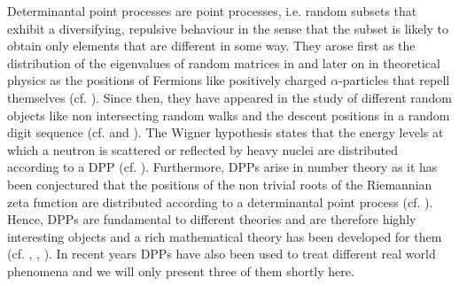 Determinantal point processes are point processes, i.e. random subsets that exhibit a diversifying, repulsive behaviour in the sense that the subset is likely to obtain only elements that are different in some way. They arose first as the distribution of the eigenvalues of random matrices in \cite{mehta1960density} and later on in theoretical physics as the positions of Fermions like positively charged \(\alpha\)-particles that repell themselves (cf. \cite{benard1973detection}). Since then, they have appeared in the study of different random objects like non intersecting random walks and the descent positions in a random digit sequence (cf. \cite{johansson2004determinantal} and \cite{borodin2010adding}). The Wigner hypothesis states that the energy levels at which a neutron is scattered or reflected by heavy nuclei are distributed according to a DPP (cf. \cite{tao2010universality}). Furthermore, DPPs arise in number theory as it has been conjectured that the positions of the non trivial roots of the Riemannian zeta function are distributed according to a determinantal point process (cf. \cite{bourgade2013quantum}). Hence, DPPs are fundamental to different theories and are therefore highly interesting objects and a rich mathematical theory has been developed for them (cf. \cite{borodin2009determinantal}, \cite{hough2006determinantal}, \cite{lyons2003determinantal}).
In recent years DPPs have also been used to treat different real world phenomena and we will only present three of them shortly here.
